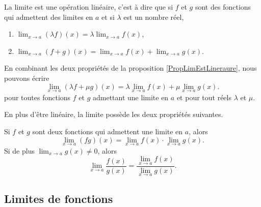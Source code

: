 \begin{proposition}	\label{PropLimEstLineraure}
	La limite est une opération linéaire, c'est à dire que si $f$ et $g$ sont des fonctions qui admettent des limites en $a$ et si $\lambda$ est un nombre réel,
	\begin{enumerate}

		\item
			$\lim_{x\to a} (\lambda f)(x)=\lambda\lim_{x\to a} f(x)$,
		\item
			$\lim_{x\to a} (f+g)(x)=\lim_{x\to a} f(x)+\lim_{x\to a} g(x)$.
	\end{enumerate}
\end{proposition}
En combinant les deux propriétés de la proposition \ref{PropLimEstLineraure}, nous pouvons écrire
\begin{equation}
	\lim_{x\to a} (\lambda f+\mu g)(x)=\lambda\lim_{x\to a} f(x)+\mu\lim_{x\to a} g(x).
\end{equation}
pour toutes fonctions $f$ et $g$ admettant une limite en $a$ et pour tout réels $\lambda$ et $\mu$.

En plus d'être linéaire, la limite possède les deux propriétés suivantes.
\begin{proposition}
	Si $f$ et $g$ sont deux fonctions qui admettent une limite en $a$, alors
	\begin{equation}
		\lim_{x\to a} (fg)(x)=\lim_{x\to a} f(x)\cdot\lim_{x\to a} g(x).
	\end{equation}
	Si de plus $\lim_{x\to a} g(x)\neq 0$, alors
	\begin{equation}
		\lim_{x\to a} \frac{ f(x) }{ g(x) }=\frac{ \lim_{x\to a} f(x) }{ \lim_{x\to a} g(x) }.
	\end{equation}
\end{proposition}

\subsection{Limites de fonctions}


